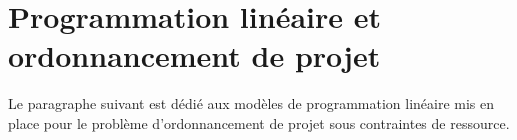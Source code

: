 \chapter{Programmation linéaire et ordonnancement
  de projet}
\label{sec:PLNE_RCPSP}


Le paragraphe suivant est dédié aux modèles de programmation linéaire
mis en place pour le problème d'ordonnancement de projet sous
contraintes de ressource. 




